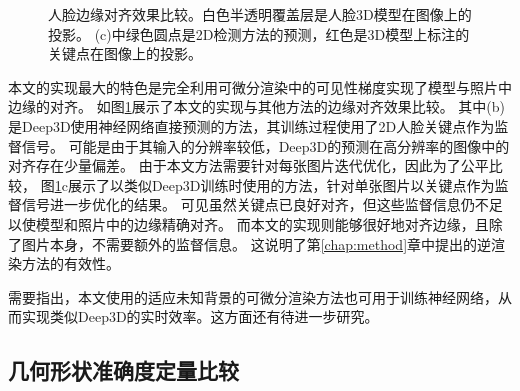\begin{figure}[tbh]
\caption[人脸边缘对齐效果比较]{
    人脸边缘对齐效果比较。白色半透明覆盖层是人脸3D模型在图像上的投影。
    (c)中绿色圆点是2D检测方法的预测，红色是3D模型上标注的关键点在图像上的投影。
}
\label{fig:edge_alignment}
\end{figure}
本文的实现最大的特色是完全利用可微分渲染中的可见性梯度实现了模型与照片中边缘的对齐。
如图\ref{fig:edge_alignment}展示了本文的实现与其他方法的边缘对齐效果比较。
其中(b)是Deep3D\citep{deep3d}使用神经网络直接预测的方法，其训练过程使用了2D人脸关键点作为监督信号。
可能是由于其输入的分辨率较低，Deep3D的预测在高分辨率的图像中的对齐存在少量偏差。
由于本文方法需要针对每张图片迭代优化，因此为了公平比较，
图\ref{fig:edge_alignment}c展示了以类似Deep3D训练时使用的方法，针对单张图片以关键点作为监督信号进一步优化的结果。
可见虽然关键点已良好对齐，但这些监督信息仍不足以使模型和照片中的边缘精确对齐。
而本文的实现则能够很好地对齐边缘，且除了图片本身，不需要额外的监督信息。
这说明了第\ref{chap:method}章中提出的逆渲染方法的有效性。

需要指出，本文使用的适应未知背景的可微分渲染方法也可用于训练神经网络，从而实现类似Deep3D的实时效率。这方面还有待进一步研究。

\subsection{几何形状准确度定量比较}

